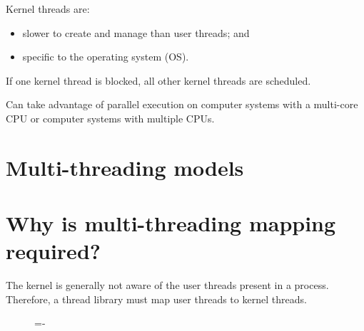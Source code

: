 \documentclass[a4paper]{systems-software}
\begin{document}
Kernel threads are:
\begin{itemize}
	\item slower to create and manage than user threads; and
	\item specific to the operating system (OS).
\end{itemize}

If one kernel thread is blocked, all other kernel threads are scheduled.

Can take advantage of parallel execution on computer systems with a multi-core CPU or computer systems with multiple CPUs.


\newpage

\section{Multi-threading models}

\section*{Why is multi-threading mapping required?}

The kernel is generally not aware of the user threads present in a process. Therefore, a thread library must map user threads to kernel threads.


\begin{figure}[H]
  \lineskip=-\fboxrule
\end{figure}
\end{document}

